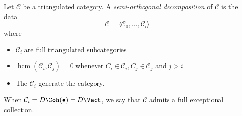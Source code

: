 

Let $\mathcal{C}$ be a triangulated category. A \emph{semi-orthogonal decomposition} of $\mathcal{C}$ is the data 
\[\mathcal{C} = \langle \mathcal{C}_0, \ldots, \mathcal{C}_i\rangle\]
where 
\begin{itemize}
    \item $\mathcal{C}_i$ are full triangulated subcategories
    \item $\hom(\mathcal{C}_i, \mathcal{C}_j) = 0$ whenever $C_i \in \mathcal{C}_i, C_j \in \mathcal{C}_j$ and $j > i$ 
    \item The $\mathcal{C}_i$ generate the category. 
\end{itemize} 
 When $\mathcal{C}_i = D\Coh(\bullet) = D\Vect$, we say that $\mathcal{C}$ admits a full exceptional collection. 

